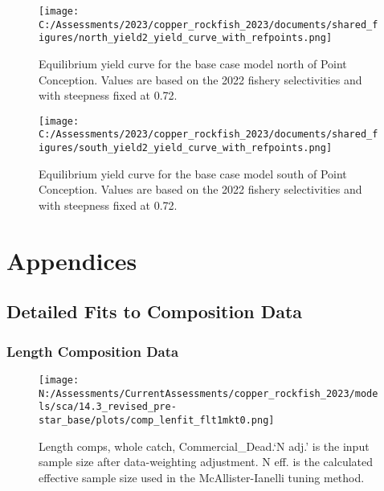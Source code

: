 \documentclass[11pt,
  english,
  letterpaper,
]{article}
\begin{document}
\pagebreak

\begin{figure}
\centering
\texttt{[image: C:/Assessments/2023/copper\_rockfish\_2023/documents/shared\_figures/north\_yield2\_yield\_curve\_with\_refpoints.png]}
\caption{Equilibrium yield curve for the base case model north of Point Conception. Values are based on the 2022 fishery selectivities and with steepness fixed at 0.72.\label{fig:yield-north}}
\end{figure}

\pagebreak

\begin{figure}
\centering
\texttt{[image: C:/Assessments/2023/copper\_rockfish\_2023/documents/shared\_figures/south\_yield2\_yield\_curve\_with\_refpoints.png]}
\caption{Equilibrium yield curve for the base case model south of Point Conception. Values are based on the 2022 fishery selectivities and with steepness fixed at 0.72.\label{fig:yield-south}}
\end{figure}

\pagebreak

\hypertarget{appendices}{%
\section{Appendices}\label{appendices}}

\hypertarget{detailed-fit-comps}{%
\subsection{Detailed Fits to Composition Data}\label{detailed-fit-comps}}

\hypertarget{length-data}{%
\subsubsection{Length Composition Data}\label{length-data}}

\begin{figure}
\centering
\texttt{[image: N:/Assessments/CurrentAssessments/copper\_rockfish\_2023/models/sca/14.3\_revised\_pre-star\_base/plots/comp\_lenfit\_flt1mkt0.png]}
\caption{Length comps, whole catch, Commercial\_Dead.`N adj.' is the input sample size after data-weighting adjustment. N eff. is the calculated effective sample size used in the McAllister-Ianelli tuning method.\label{fig:comp_lenfit_flt1mkt0}}
\end{figure}
\end{document}
